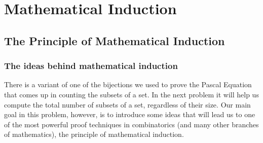 \documentclass[10pt,]{book}
\theoremstyle{plain}
\theoremstyle{definition}
\numberwithin{equation}{chapter}
\begin{document}
\chapter[{Mathematical Induction}]{Mathematical Induction}\label{Induction}
\typeout{************************************************}
\typeout{************************************************}
\section[{The Principle of Mathematical Induction}]{The Principle of Mathematical Induction}\label{section-5}
\typeout{************************************************}
\typeout{************************************************}
\subsection[{The ideas behind mathematical induction}]{The ideas behind mathematical induction}\label{subsection-11}
There is a variant of one of the bijections we used to prove the Pascal Equation that comes up in counting the subsets of a set. In the next problem it will help us compute the total number of subsets of a set, regardless of their size. Our main goal in this problem, however, is to introduce some ideas that will lead us to one of the most powerful proof techniques in combinatorics (and many other branches of mathematics), the principle of mathematical induction.%
\end{document}
